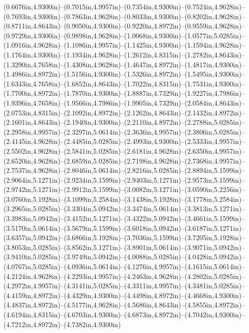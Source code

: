 (0.6676in,4.9300in)--(0.7015in,4.9957in)--(0.7354in,4.9300in)--(0.7524in,4.9628in)--(0.7693in,4.9300in)--(0.7863in,4.9628in)--(0.8033in,4.9300in)--(0.8202in,4.9628in)--(0.8711in,4.8643in)--(0.9050in,4.9300in)--(0.9220in,4.8972in)--(0.9559in,4.9628in)--(0.9729in,4.9300in)--(0.9898in,4.9628in)--(1.0068in,4.9300in)--(1.0577in,5.0285in)--(1.0916in,4.9628in)--(1.1086in,4.9957in)--(1.1425in,4.9300in)--(1.1594in,4.9628in)--(1.1764in,4.9300in)--(1.1934in,4.9628in)--(1.2612in,4.8315in)--(1.2782in,4.8643in)--(1.3290in,4.7658in)--(1.4308in,4.9628in)--(1.4647in,4.8972in)--(1.4817in,4.9300in)--(1.4986in,4.8972in)--(1.5156in,4.9300in)--(1.5326in,4.8972in)--(1.5495in,4.9300in)--(1.6343in,4.7658in)--(1.6852in,4.8643in)--(1.7022in,4.8315in)--(1.7531in,4.9300in)--(1.7700in,4.8972in)--(1.7870in,4.9300in)--(1.8887in,4.7329in)--(1.9227in,4.7986in)--(1.9396in,4.7658in)--(1.9566in,4.7986in)--(1.9905in,4.7329in)--(2.0584in,4.8643in)--(2.0753in,4.8315in)--(2.1092in,4.8972in)--(2.1262in,4.8643in)--(2.1432in,4.8972in)--(2.1601in,4.8643in)--(2.1940in,4.9300in)--(2.2110in,4.8972in)--(2.2788in,5.0285in)--(2.2958in,4.9957in)--(2.3297in,5.0614in)--(2.3636in,4.9957in)--(2.3806in,5.0285in)--(2.4145in,4.9628in)--(2.4485in,5.0285in)--(2.4993in,4.9300in)--(2.5333in,4.9957in)--(2.5502in,4.9628in)--(2.5841in,5.0285in)--(2.6181in,4.9628in)--(2.6350in,4.9957in)--(2.6520in,4.9628in)--(2.6859in,5.0285in)--(2.7198in,4.9628in)--(2.7368in,4.9957in)--(2.7537in,4.9628in)--(2.8046in,5.0614in)--(2.8216in,5.0285in)--(2.8894in,5.1599in)--(2.9064in,5.1271in)--(2.9234in,5.1599in)--(2.9403in,5.1271in)--(2.9573in,5.1599in)--(2.9742in,5.1271in)--(2.9912in,5.1599in)--(3.0082in,5.1271in)--(3.0590in,5.2256in)--(3.0760in,5.1928in)--(3.1099in,5.2584in)--(3.1438in,5.1928in)--(3.1778in,5.2584in)--(3.2965in,5.0285in)--(3.3304in,5.0942in)--(3.3474in,5.0614in)--(3.3813in,5.1271in)--(3.3983in,5.0942in)--(3.4152in,5.1271in)--(3.4322in,5.0942in)--(3.4661in,5.1599in)--(3.5170in,5.0614in)--(3.5679in,5.1599in)--(3.6018in,5.0942in)--(3.6187in,5.1271in)--(3.6357in,5.0942in)--(3.6866in,5.1928in)--(3.7036in,5.1599in)--(3.7205in,5.1928in)--(3.8053in,5.0285in)--(3.8562in,5.1271in)--(3.8901in,5.0614in)--(3.9071in,5.0942in)--(3.9410in,5.0285in)--(3.9749in,5.0942in)--(4.0088in,5.0285in)--(4.0428in,5.0942in)--(4.0767in,5.0285in)--(4.0936in,5.0614in)--(4.1276in,4.9957in)--(4.1615in,5.0614in)--(4.2124in,4.9628in)--(4.2293in,4.9957in)--(4.2463in,4.9628in)--(4.2802in,5.0285in)--(4.2972in,4.9957in)--(4.3141in,5.0285in)--(4.3311in,4.9957in)--(4.3481in,5.0285in)--(4.4159in,4.8972in)--(4.4329in,4.9300in)--(4.4498in,4.8972in)--(4.4668in,4.9300in)--(4.4837in,4.8972in)--(4.5177in,4.9628in)--(4.5686in,4.8643in)--(4.5855in,4.8972in)--(4.6194in,4.8315in)--(4.6703in,4.9300in)--(4.6873in,4.8972in)--(4.7042in,4.9300in)--(4.7212in,4.8972in)--(4.7382in,4.9300in) 